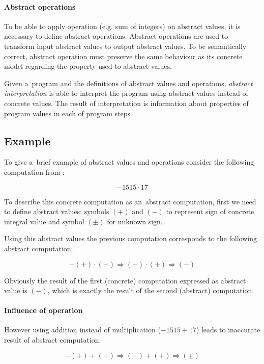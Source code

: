 \documentclass[12pt,oneside]{fithesis2}
\theoremstyle{definition}
\begin{document}
\paragraph{Abstract operations}
To be able to apply operation (e.g. sum of integers) on abstract values, it is necessary to define abstract operations. Abstract operations are used to transform input abstract values to output abstract values. To be semantically correct, abstract operation must preserve the same behaviour as its concrete model regarding the property used to abstract values.

\vspace{1\baselineskip} %

Given a~program and the definitions of abstract values and operations, \textit{abstract interpretation} is able to interpret the program using abstract values instead of concrete values. The result of interpretation is information about properties of program values in each of program steps.


\subsection{Example}\label{sec:example}

To give a~brief example of abstract values and operations consider the following computation from \cite{CousotCousot77-1}:

\[ -1515 \cdot 17 \]

To describe this concrete computation as an~abstract computation, first we need to define abstract values: symbols $(+)$ and $(-)$ to represent sign of concrete integral value and symbol $(\pm)$ for unknown sign.

Using this abstract values the previous computation corresponds to the following abstract computation:

\[ -(+) \cdot (+) \Rightarrow (-) \cdot (+) \Rightarrow (-) \]

Obviously the result of the first (concrete) computation expressed as abstract value is $(-)$, which is exactly the result of the second (abstract) computation.

\paragraph{Influence of operation}
However using addition instead of multiplication ($-1515 + 17$) leads to inaccurate result of abstract computation:

\[ -(+) + (+) \Rightarrow (-) + (+) \Rightarrow (\pm) \]
\end{document}
